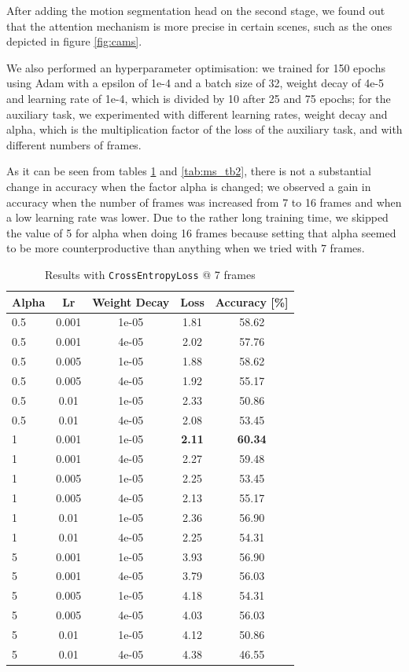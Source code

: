 \documentclass[10pt,twocolumn,letterpaper]{article}
\begin{document}
After adding the motion segmentation head on the second stage, we found out that the attention mechanism is more precise in certain scenes, such as the ones depicted in figure \ref{fig:cams}.

We also performed an hyperparameter optimisation: we trained for 150 epochs using Adam with a epsilon of 1e-4 and a batch size of 32, weight decay of 4e-5 and learning rate of 1e-4, which is divided by 10 after 25 and 75 epochs; for the auxiliary task, we experimented with different learning rates, weight decay and alpha, which is the multiplication factor of the loss of the auxiliary task, and with different numbers of frames.

As it can be seen from tables \ref{tab:ms_tb1} and \ref{tab:ms_tb2}, there is not a substantial change in accuracy when the factor alpha is changed; we observed a gain in accuracy when the number of frames was increased from 7 to 16 frames and when a low learning rate was lower. Due to the rather long training time, we skipped the value of 5 for alpha when doing 16 frames because setting that alpha seemed to be more counterproductive than anything when we tried with 7 frames.

\begin{table}[h!]
	\vspace*{0pt}
	\begin{center}
		\begin{tabular}{lcc|cc}
			\textbf{Alpha} & \textbf{Lr} & \textbf{Weight Decay} & \textbf{Loss} & \textbf{Accuracy [\%]}\\
			\hline
			0.5&0.001&1e-05&1.81&58.62\\
			0.5&0.001&4e-05&2.02&57.76\\
			0.5&0.005&1e-05&1.88&58.62\\
			0.5&0.005&4e-05&1.92&55.17\\
			0.5&0.01&1e-05&2.33&50.86\\
			0.5&0.01&4e-05&2.08&53.45\\
			1&0.001&1e-05&\textbf{2.11}&\textbf{60.34}\\
			1&0.001&4e-05&2.27&59.48\\
			1&0.005&1e-05&2.25&53.45\\
			1&0.005&4e-05&2.13&55.17\\
			1&0.01&1e-05&2.36&56.90\\
			1&0.01&4e-05&2.25&54.31\\
			5&0.001&1e-05&3.93&56.90\\
			5&0.001&4e-05&3.79&56.03\\
			5&0.005&1e-05&4.18&54.31\\
			5&0.005&4e-05&4.03&56.03\\
			5&0.01&1e-05&4.12&50.86\\
			5&0.01&4e-05&4.38&46.55\\
			\hline
		\end{tabular}
	\end{center}	
	\caption{Results with \texttt{CrossEntropyLoss} @ 7 frames}
	\label{tab:ms_tb1}
\end{table}
\end{document}
